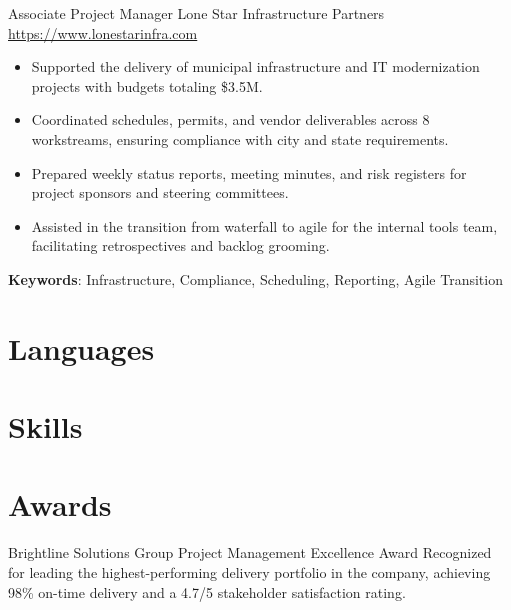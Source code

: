 \documentclass[a4paper, serif, 10pt]{moderncv}
\begin{document}
        {Associate Project Manager}
        {Lone Star Infrastructure Partners}
        {\url{https://www.lonestarinfra.com}}
        {}
        {\begin{itemize}
\item Supported the delivery of municipal infrastructure and IT modernization projects with budgets totaling \$3.5M.
\item Coordinated schedules, permits, and vendor deliverables across 8 workstreams, ensuring compliance with city and state requirements.
\item Prepared weekly status reports, meeting minutes, and risk registers for project sponsors and steering committees.
\item Assisted in the transition from waterfall to agile for the internal tools team, facilitating retrospectives and backlog grooming.
\end{itemize}
\textbf{Keywords}: Infrastructure, Compliance, Scheduling, Reporting, Agile Transition}
\section{Languages}

\section{Skills}

\section{Awards}

        {Brightline Solutions Group}
        {Project Management Excellence Award}
        {}
        {}
        {Recognized for leading the highest-performing delivery portfolio in the company, achieving 98\% on-time delivery and a 4.7/5 stakeholder satisfaction rating.}
\end{document}
